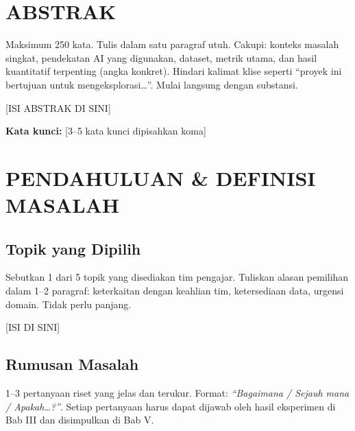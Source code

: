 \documentclass[11pt,a4paper,oneside]{report}
\begin{document}
\chapter*{ABSTRAK}

\begin{petunjuk}
Maksimum 250 kata. Tulis dalam satu paragraf utuh. Cakupi: konteks masalah singkat, pendekatan AI yang digunakan, dataset, metrik utama, dan hasil kuantitatif terpenting (angka konkret). Hindari kalimat klise seperti ``proyek ini bertujuan untuk mengeksplorasi\ldots''. Mulai langsung dengan substansi.
\end{petunjuk}

[ISI ABSTRAK DI SINI]

\vspace{1em}
\noindent\textbf{Kata kunci:} [3--5 kata kunci dipisahkan koma]

\chapter{PENDAHULUAN \& DEFINISI MASALAH}
\label{bab:pendahuluan}

\section{Topik yang Dipilih}
\begin{petunjuk}
Sebutkan 1 dari 5 topik yang disediakan tim pengajar. Tuliskan alasan pemilihan dalam 1--2 paragraf: keterkaitan dengan keahlian tim, ketersediaan data, urgensi domain. Tidak perlu panjang.
\end{petunjuk}

[ISI DI SINI]

\section{Rumusan Masalah}
\begin{petunjuk}
1--3 pertanyaan riset yang jelas dan terukur. Format: \textit{``Bagaimana / Sejauh mana / Apakah\ldots?''}. Setiap pertanyaan harus dapat dijawab oleh hasil eksperimen di Bab III dan disimpulkan di Bab V.
\end{petunjuk}
\end{document}
